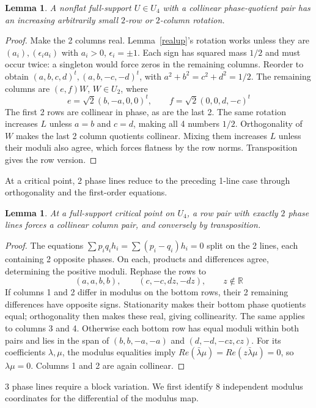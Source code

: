 \documentclass[11pt,a4paper]{article}
\newtheorem{lem}[thm]{Lemma}
\begin{document}
\begin{lem}\label{onepair}
A nonflat full-support $U\in U_4$ with a collinear phase-quotient pair
has an increasing arbitrarily small $2$-row or $2$-column rotation.
\end{lem}
\begin{proof}
Make the 2 columns real. Lemma~\ref{realup}'s rotation works unless
they are $(a_i),(\epsilon_i a_i)$ with $a_i>0$, $\epsilon_i=\pm1$.
Each sign has squared mass $1/2$ and must occur twice: a singleton would
force zeros in the remaining columns. Reorder to obtain
$(a,b,c,d)^t,(a,b,-c,-d)^t$, with $a^2+b^2=c^2+d^2=1/2$.
The remaining columns are $(e,f)W$, $W\in U_2$, where
\[
 e=\sqrt2(b,-a,0,0)^t,\qquad f=\sqrt2(0,0,d,-c)^t
\]
The first 2 rows are collinear in phase, as are the last 2.
The same rotation increases $L$ unless $a=b$ and $c=d$, making all
4 numbers $1/2$. Orthogonality of $W$ makes the last 2 column
quotients collinear. Mixing them increases $L$ unless their moduli
also agree, which forces flatness by the row norms. Transposition
gives the row version.
\end{proof}
At a critical point, 2 phase lines reduce to the preceding 1-line
case through orthogonality and the first-order equations.

\begin{lem}\label{twosingle}
At a full-support critical point on $U_4$, a row pair with exactly $2$
phase lines forces a collinear column pair, and conversely by transposition.
\end{lem}
\begin{proof}
The equations $\sum p_iq_ih_i=\sum(p_i-q_i)h_i=0$ split on the 2
lines, each containing 2 opposite phases. On each, products and
differences agree, determining the positive moduli. Rephase the rows to
\[
 (a,a,b,b),\qquad(c,-c,dz,-dz),\qquad z\notin\mathbb R
\]
If columns 1 and 2 differ in modulus on the bottom rows, their 2
remaining differences have opposite signs. Stationarity makes their
bottom phase quotients equal; orthogonality then makes these real,
giving collinearity. The same applies to columns 3 and 4.
Otherwise each bottom row has equal moduli within both pairs and lies
in the span of $(b,b,-a,-a)$ and $(d,-d,-cz,cz)$.
For its coefficients $\lambda,\mu$, the modulus equalities imply
$Re(\bar\lambda\mu)=Re(z\bar\lambda\mu)=0$, so
$\lambda\mu=0$. Columns 1 and 2 are again collinear.
\end{proof}
3 phase lines require a block variation. We first identify 8
independent modulus coordinates for the differential of the modulus map.
\end{document}
